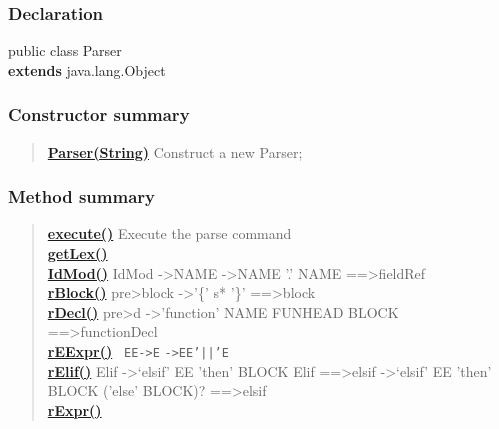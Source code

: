 {{{{\subsubsection{Declaration}{
\small public class Parser
\\ {\bf  extends} java.lang.Object
}
\subsubsection{Constructor summary}{
\begin{verse}
\hyperlink{org.openmrs.module.dssmodule.parser.Parser(java.lang.String)}{{\bf Parser(String)}} Construct a new Parser;\\
\end{verse}
}
\subsubsection{Method summary}{
\begin{verse}
\hyperlink{org.openmrs.module.dssmodule.parser.Parser.execute()}{{\bf execute()}} Execute the parse command\\
\hyperlink{org.openmrs.module.dssmodule.parser.Parser.getLex()}{{\bf getLex()}} \\
\hyperlink{org.openmrs.module.dssmodule.parser.Parser.IdMod()}{{\bf IdMod()}} IdMod -\textgreater  NAME -\textgreater  NAME '.' NAME ==\textgreater  fieldRef\\
\hyperlink{org.openmrs.module.dssmodule.parser.Parser.rBlock()}{{\bf rBlock()}} pre\textgreater  block -\textgreater  '\{' s* '\}' ==\textgreater  block\\
\hyperlink{org.openmrs.module.dssmodule.parser.Parser.rDecl()}{{\bf rDecl()}} pre\textgreater  d -\textgreater  'function' NAME FUNHEAD BLOCK ==\textgreater  functionDecl\\
\hyperlink{org.openmrs.module.dssmodule.parser.Parser.rEExpr()}{{\bf rEExpr()}} \texttt{\small
\mbox{}\newline \phantom{ }EE\phantom{ }-\textgreater \phantom{ }E}\mbox{}\newline
\texttt{\small \phantom{ }\phantom{ }\phantom{ }\phantom{ }-\textgreater \phantom{ }EE\phantom{ }'||'\phantom{ }E}
\\
\hyperlink{org.openmrs.module.dssmodule.parser.Parser.rElif()}{{\bf rElif()}} Elif -\textgreater  ‘elsif’ EE 'then' BLOCK Elif ==\textgreater  elsif -\textgreater  ‘elsif’ EE 'then' BLOCK ('else' BLOCK)? ==\textgreater  elsif\\
\hyperlink{org.openmrs.module.dssmodule.parser.Parser.rExpr()}{{\bf rExpr()}} \texttt{\small
}
\end{verse}}}}}}
